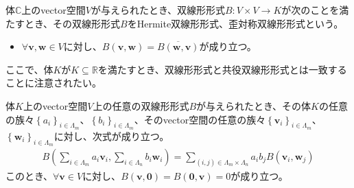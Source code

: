 \documentclass[dvipdfmx]{jsarticle}
\begin{document}
\begin{dfn}
体$\mathbb{C}$上のvector空間$V$が与えられたとき、双線形形式$B:V \times V \rightarrow K$が次のことを満たすとき、その双線形形式$B$をHermite双線形形式、歪対称双線形形式という。
\begin{itemize}
\item
  $\forall\mathbf{v},\mathbf{w} \in V$に対し、$B\left( \mathbf{v},\mathbf{w} \right) = \overline{B\left( \mathbf{w},\mathbf{v} \right)}$が成り立つ。
\end{itemize}
\end{dfn}\par
ここで、体$K$が$K \subseteq \mathbb{R}$を満たすとき、双線形形式と共役双線形形式とは一致することに注意されたい。
\begin{thm}\label{2.3.4.1}
体$K$上のvector空間$V$上の任意の双線形形式$B$が与えられたとき、その体$K$の任意の族々$\left\{ a_{i} \right\}_{i \in \varLambda_{m}}$、$\left\{ b_{i} \right\}_{i \in \varLambda_{m}}$、そのvector空間の任意の族々$\left\{ \mathbf{v}_{i} \right\}_{i \in \varLambda_{m}}$、$\left\{ \mathbf{w}_{i} \right\}_{i \in \varLambda_{m}}$に対し、次式が成り立つ。
\begin{align*}
B\left( \sum_{i \in \varLambda_{m}} {a_{i}\mathbf{v}_{i}},\sum_{i \in \varLambda_{n}} {b_{i}\mathbf{w}_{i}} \right) = \sum_{(i,j) \in \varLambda_{m} \times \varLambda_{n}} {a_{i}b_{j}B\left( \mathbf{v}_{i},\mathbf{w}_{j} \right)}
\end{align*}
このとき、$\forall\mathbf{v} \in V$に対し、$B\left( \mathbf{v},\mathbf{0} \right) = B\left( \mathbf{0},\mathbf{v} \right) = 0$が成り立つ。
\end{thm}
\end{document}

